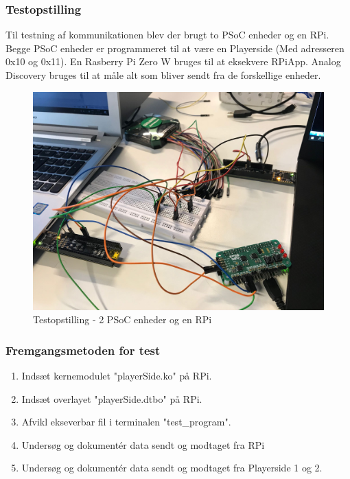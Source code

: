 \documentclass[Integrationstest/Integrationstest_main.tex]{subfiles}
\begin{document}
\subsubsection{Testopstilling}
Til testning af kommunikationen blev der brugt to PSoC enheder og en RPi. Begge PSoC enheder er programmeret til at være en Playerside (Med adresseren 0x10 og 0x11). En Rasberry Pi Zero W bruges til at eksekvere RPiApp. Analog Discovery bruges til at måle alt som bliver sendt fra de forskellige enheder. 
\begin{figure}[H]
    \centering
    \includegraphics[width=1\textwidth]{Integrationstest/PlayersideogRPi/graphicsRPivPlay/integrationPlayervRPi.jpg}
    \caption{Testopstilling - 2 PSoC enheder og en RPi}
    \label{fig:test_Playerside_RPi}
\end{figure}

\subsubsection{Fremgangsmetoden for test}
\begin{enumerate}
    \item Indsæt kernemodulet "playerSide.ko" på RPi. 
    \item Indsæt overlayet "playerSide.dtbo" på RPi. 
    \item Afvikl ekseverbar fil i terminalen "test\_program". 
    \item Undersøg og dokumentér data sendt og modtaget fra RPi 
    \item Undersøg og dokumentér data sendt og modtaget fra Playerside 1 og 2. 
\end{enumerate}
\end{document}
